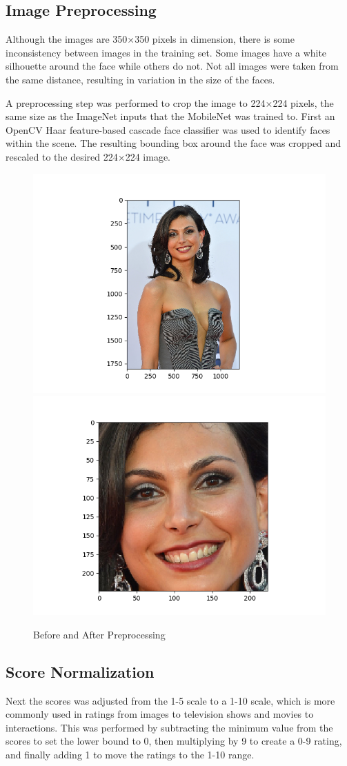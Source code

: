 \documentclass{article}
\begin{document}
\subsection{Image Preprocessing}

Although the images are 350$\times$350 pixels in dimension, there is some inconsistency between images in the training set.  Some images have a white silhouette around the face while others do not.  Not all images were taken from the same distance, resulting in variation in the size of the faces.

A preprocessing step was performed to crop the image to 224$\times$224 pixels, the same size as the ImageNet inputs that the MobileNet was trained to.  First an OpenCV \citep{opencv} Haar feature-based cascade face classifier was used to identify faces within the scene.  The resulting bounding box around the face was cropped and rescaled to the desired 224$\times$224 image.

\begin{figure}[H]
    \centering
    \includegraphics[width=.45\linewidth]{before-preprocessing.png}
    \includegraphics[width=.45\linewidth]{after-preprocessing.png}
    \caption{Before and After Preprocessing}
    \label{preprocessing}
\end{figure}

\subsection{Score Normalization}

Next the scores was adjusted from the 1-5 scale to a 1-10 scale, which is more commonly used in ratings from images to television shows and movies to interactions.  This was performed by subtracting the minimum value from the scores to set the lower bound to 0, then multiplying by 9 to create a 0-9 rating, and finally adding 1 to move the ratings to the 1-10 range.
\end{document}
